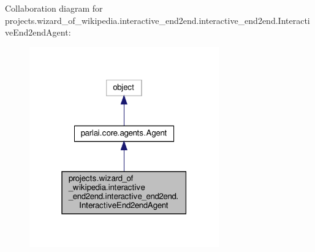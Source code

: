Collaboration diagram for projects.\+wizard\+\_\+of\+\_\+wikipedia.\+interactive\+\_\+end2end.\+interactive\+\_\+end2end.\+Interactive\+End2end\+Agent\+:
\nopagebreak
\begin{figure}[H]
\begin{center}
\leavevmode
\includegraphics[width=232pt]{classprojects_1_1wizard__of__wikipedia_1_1interactive__end2end_1_1interactive__end2end_1_1InteractiveEnd2endAgent__coll__graph}
\end{center}
\end{figure}
